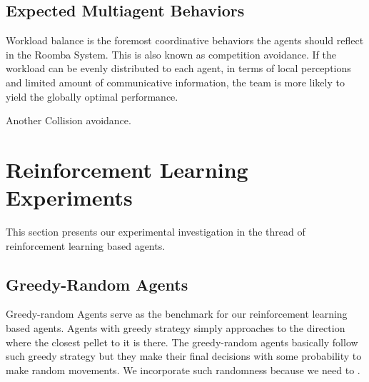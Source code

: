 \documentclass[conference]{IEEEtran}
\begin{document}
\subsection{Expected Multiagent Behaviors}

Workload balance is the foremost coordinative behaviors the
agents should reflect in the Roomba System. This is also known as competition
avoidance. If the workload can be evenly distributed to each agent, in terms of
local perceptions and limited amount of communicative information, the team is
more likely to yield the globally optimal performance.

Another Collision avoidance. 

%
%
%

\section{Reinforcement Learning Experiments}
\label{section:rlexpo} 

This section presents our experimental investigation in the thread of reinforcement
learning based agents.

\subsection{Greedy-Random Agents} 
Greedy-random Agents serve as the benchmark for our reinforcement
learning based agents.
Agents with greedy strategy simply approaches to the direction where the
closest pellet to it is there.
The greedy-random agents basically follow such greedy strategy but they make
their final decisions with some probability to make random movements. 
We incorporate such randomness because we need to .
\end{document}
